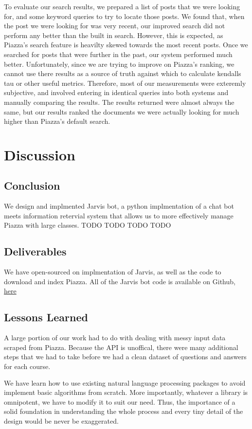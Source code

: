 \documentclass[sigconf]{acmart}
\begin{document}
To evaluate our search results, we prepared a list of posts that we were looking for, and some keyword queries to try to locate those posts. We found that, when the post we were looking for was very recent, our improved search did not perform any better than the built in search. However, this is expected, as Piazza's search feature is heavilty skewed towards the most recent posts. Once we searched for posts that were further in the past, our system performed much better. Unfortunately, since we are trying to improve on Piazza's ranking, we cannot use there results as a source of truth against which to calculate kendalls tau or other useful metrics. Therefore, most of our measurements were exteremly subjective, and involved entering in identical queries into both systems and manually comparing the results. The results returned were almost always the same, but our results ranked the documents we were actually looking for much higher than Piazza's default search.

\section{Discussion}

\subsection{Conclusion}
We design and implmented Jarvis bot, a python implmentation of a chat bot meets information retervial system that allows us to more effectively manage Piazza with large classes.
TODO TODO TODO TODO

\subsection{Deliverables}
We have open-sourced on implmentation of Jarvis, as well as the code to download and index Piazza. All of the Jarvis bot code is available on Github, \href{https://github.com/pranavr93/piazza_bot}{here}

\subsection{Lessons Learned}
A large portion of our work had to do with dealing with messy input data scraped from Piazza. Because the API is unoffical, there were many additional steps that we had to take before we had a clean dataset of questions and answers for each course. 

We have learn how to use existing natural language processing packages to avoid implement basic algorithms from scratch. More importantly, whatever a library is omnipotent, we have to modify it to suit our need. Thus, the importance of a solid foundation in understanding the whole process and every tiny detail of the design would be never be exaggerated. 
\end{document}
